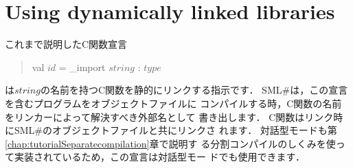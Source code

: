 \documentclass{jbook}
\newcommand{\txt}[2]{#2}
\newcommand{\smlsharp}{SML\#}
\newenvironment{program}{\begin{tt}\begin{quote}}{\end{quote}\end{tt}}
\begin{document}

\section{\txt{動的リンクライブラリの使用}{Using dynamically linked libraries}}
\label{sec:tutorialDynamiclinc}

\ifx\jp%
	これまで説明したC関数宣言
\begin{program}
val $id$ = \_import $string$ : $type$
\end{program}
は$string$の名前を持つC関数を静的にリンクする指示です．
	\smlsharp{}は，この宣言を含むプログラムをオブジェクトファイルに
コンパイルする時，C関数の名前をリンカーによって解決すべき外部名として
書き出します．
	C関数はリンク時に\smlsharp{}のオブジェクトファイルと共にリンクさ
れます．
	対話型モードも第\ref{chap:tutorialSeparatecompilation}章で説明す
る分割コンパイルのしくみを使って実装されているため，この宣言は対話型モー
ドでも使用できます．
\end{document}
